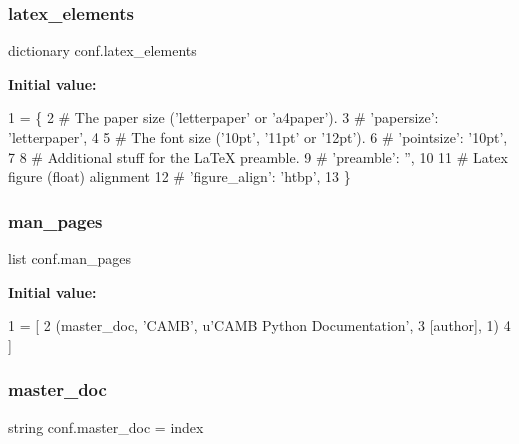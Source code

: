 \subsubsection{\texorpdfstring{latex\+\_\+elements}{latex\_elements}}
{\footnotesize\ttfamily dictionary conf.\+latex\+\_\+elements}

{\bfseries Initial value\+:}
\begin{DoxyCode}
1 =  \{
2 \textcolor{comment}{# The paper size ('letterpaper' or 'a4paper').}
3 \textcolor{comment}{# 'papersize': 'letterpaper',}
4 
5 \textcolor{comment}{# The font size ('10pt', '11pt' or '12pt').}
6 \textcolor{comment}{# 'pointsize': '10pt',}
7 
8 \textcolor{comment}{# Additional stuff for the LaTeX preamble.}
9 \textcolor{comment}{# 'preamble': '',}
10 
11 \textcolor{comment}{# Latex figure (float) alignment}
12 \textcolor{comment}{# 'figure\_align': 'htbp',}
13 \}
\end{DoxyCode}
\mbox{\label{namespaceconf_a45cae4ca704c12a150b112eb1b66d0b1}} 
\subsubsection{\texorpdfstring{man\+\_\+pages}{man\_pages}}
{\footnotesize\ttfamily list conf.\+man\+\_\+pages}

{\bfseries Initial value\+:}
\begin{DoxyCode}
1 =  [
2     (master\_doc, \textcolor{stringliteral}{'CAMB'}, \textcolor{stringliteral}{u'CAMB Python Documentation'},
3      [author], 1)
4 ]
\end{DoxyCode}
\mbox{\label{namespaceconf_ae22a29d94a222730836db739d6dbd71e}} 
\subsubsection{\texorpdfstring{master\+\_\+doc}{master\_doc}}
{\footnotesize\ttfamily string conf.\+master\+\_\+doc = \textquotesingle{}index\textquotesingle{}}

\mbox{\label{namespaceconf_aa0ec3e2d302f8100428e8ffcf81824b6}} 
